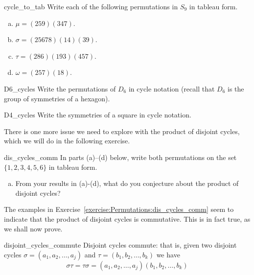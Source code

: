 \begin{exercise}{cycle_to_tab}
Write each of the following permutations in $S_9$ in tableau form.
\begin{multicols}{2}
\begin{enumerate}[(a)]
\item
$\mu = (259)(347)$.
\item
$\sigma = (25678)(14)(39)$.
\item
$\tau = (286)(193)(457)$.
\item
$\omega = (257)(18)$.
\end{enumerate}
\end{multicols}
\end{exercise}

\begin{exercise}{D6_cycles}
Write the permutations of $D_6$ in cycle notation (recall that $D_6$ is the group of symmetries of a hexagon).
\end{exercise}

\begin{exercise}{D4_cycles}
Write the symmetries of a square in cycle notation.
\end{exercise}

There is one more issue we need to explore with the product of disjoint cycles, which we will do in the following exercise.

\begin{exercise}{dis_cycles_comm}
In parts (a)--(d) below, write both permutations on the set $\{1,2,3,4,5,6\}$ in tableau form.
\begin{enumerate}[(a)]
\item
From your results in (a)-(d), what do you conjecture about the product of disjoint cycles?
\end{enumerate}
\end{exercise}
The examples in Exercise~\ref{exercise:Permutations:dis_cycles_comm} seem to indicate that the product of disjoint cycles is commutative. This is in fact true, as we shall now prove.
 
\begin{prop}{disjoint_cycles_commute}
Disjoint cycles commute: that is, given two disjoint cycles $\sigma = (a_1, a_2, \ldots, a_j)$ and $\tau = (b_1, b_2, \ldots, b_k)$ we have
\[
\sigma \tau = \tau \sigma = (a_1, a_2, \ldots, a_j) (b_1, b_2, \ldots, b_k) \]
\end{prop}

